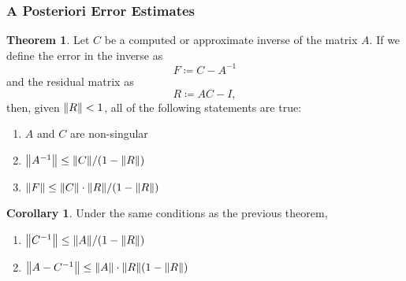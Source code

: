 \documentclass[11pt,letterpaper]{article}
\numberwithin{figure}{section} %
\newcommand{\inv}[1]{#1^{-1}}
\newcommand{\keyword}[1]{\colorbox{cyan!20!}{#1}}
\theoremstyle{definition}
\newtheorem{theorem}{Theorem}[subsection]
\theoremstyle{definition}
\theoremstyle{definition}
\theoremstyle{definition}
\theoremstyle{definition}
\newtheorem*{corollary}{Corollary}
\theoremstyle{remark}
\theoremstyle{remark}
\theoremstyle{definition}
\theoremstyle{remark}
\theoremstyle{remark}
\begin{document}
\begin{multicols*}{3}
\subsubsection{A Posteriori Error Estimates}
\begin{theorem}
	Let $C$ be a computed or approximate inverse of the matrix $A$. If we define
	the error in the inverse as
	\[
		F \coloneqq C - \inv{A}
	\]
	and the \keyword{residual matrix} as
	\[
		R \coloneqq AC - I,
	\]
	then, given $\norm{R}	< 1$, all of the following statements are true:
	\begin{enumerate}[label={(\alph*)}]
	\item $A$ and $C$ are non-singular
	\item $\norm{\inv{A}} \leq \norm{C} / (1 - \norm{R})$
	\item $\norm{F} \leq \norm{C} \cdot \norm{R}/(1 - \norm{R})$
	\end{enumerate}
\end{theorem}
\begin{corollary}
	Under the same conditions as the previous theorem, 
	\begin{enumerate}[label={(\alph*)}, start=4]
		\item $\norm{\inv{C}} \leq \norm{A} / (1 - \norm{R})$
		\item $\norm{A - \inv{C}} \leq \norm{A} \cdot \norm{R}(1 - \norm{R})$
	\end{enumerate}
\end{corollary}

\end{multicols*}
\end{document}
